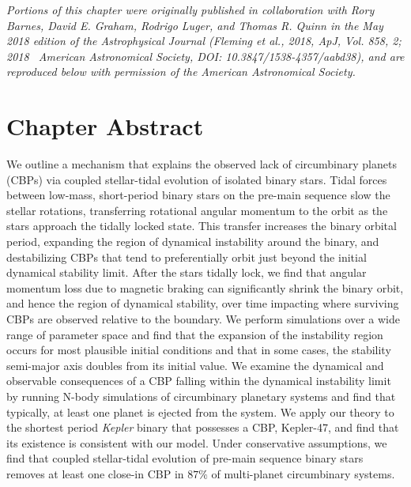\textit{Portions of this chapter were originally published in collaboration with Rory Barnes, David E. Graham, Rodrigo Luger, and Thomas R. Quinn in the May 2018 edition of the Astrophysical Journal (Fleming et al., 2018, ApJ, Vol. 858, 2; 2018 \textcopyright \ American Astronomical Society, DOI: 10.3847/1538-4357/aabd38), and are reproduced below with permission of the American Astronomical Society.}

\section{Chapter Abstract}


We outline a mechanism that explains the observed lack of circumbinary planets (CBPs) via coupled stellar-tidal evolution of isolated binary stars.  Tidal forces between low-mass, short-period binary stars on the pre-main sequence slow the stellar rotations, transferring rotational angular momentum to the orbit as the stars approach the tidally locked state.  This transfer increases the binary orbital period, expanding the region of dynamical instability around the binary, and destabilizing CBPs that tend to preferentially orbit just beyond the initial dynamical stability limit.  After the stars tidally lock, we find that angular momentum loss due to magnetic braking can significantly shrink the binary orbit, and hence the region of dynamical stability, over time impacting where surviving CBPs are observed relative to the boundary.  We perform simulations over a wide range of parameter space and find that the expansion of the instability region occurs for most plausible initial conditions and that in some cases, the stability semi-major axis doubles from its initial value.  We examine the dynamical and observable consequences of a CBP falling within the dynamical instability limit by running N-body simulations of circumbinary planetary systems and find that typically, at least one planet is ejected from the system.  We apply our theory to the shortest period {\it Kepler} binary that possesses a CBP, Kepler-47, and find that its existence is consistent with our model.  Under conservative assumptions, we find that coupled stellar-tidal evolution of pre-main sequence binary stars removes at least one close-in CBP in $87\%$ of multi-planet circumbinary systems.

